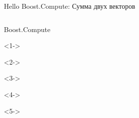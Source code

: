 \documentclass[@BEAMER_OPTIONS@]{beamer}
\begin{document}
\begin{frame}[fragile]{Hello Boost.Compute: Сумма двух векторов}
\begin{columns}
\begin{column}{0.7\textwidth}
            \begin{minipage}[c][\textheight][c]{\linewidth}
                \begin{exampleblock}{Boost.Compute}
                    \begin{adjustbox}{width=0.7\textwidth, height=\textheight, keepaspectratio}
                        \begin{minipage}{\textwidth}
                            \begin{uncoverenv}<1->
                                
                            \end{uncoverenv}
                            \begin{uncoverenv}<2->
                                
                            \end{uncoverenv}
                            \begin{uncoverenv}<3->
                                
                            \end{uncoverenv}
                            \begin{uncoverenv}<4->
                                
                            \end{uncoverenv}
                            \begin{uncoverenv}<5->
                                
                            \end{uncoverenv}
                        \end{minipage}
                    \end{adjustbox}
                \end{exampleblock}
            \end{minipage}
        \end{column}
    \end{columns}
\end{frame}
\end{document}
